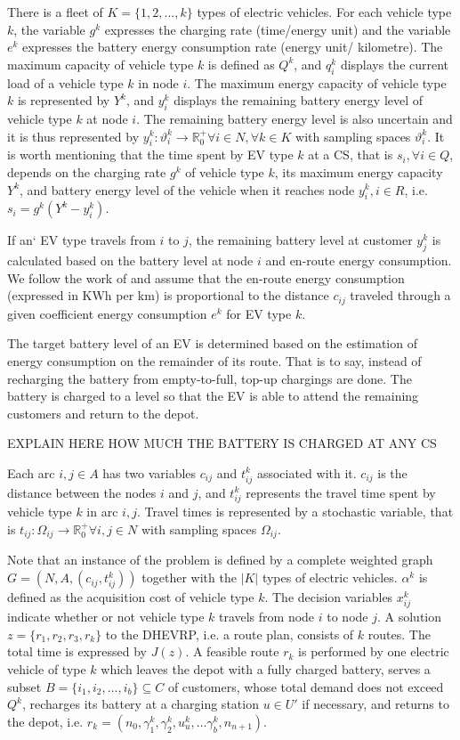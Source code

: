 \documentclass[11pt]{article}
\begin{document}
There is a fleet of $K = \{1,2,...,k\}$ types of electric vehicles. For each vehicle type $k$, the variable $g^k$ expresses the charging rate (time/energy unit) and the variable $e^k$ expresses the battery energy consumption rate (energy unit/ kilometre). The maximum capacity of vehicle type $k$ is defined as $Q^k$, and $q^k_i$ displays the current load of a vehicle type $k$ in node $i$. The maximum energy capacity of vehicle type $k$ is represented by $Y^k$, and $y^k_i$ displays the remaining battery energy level of vehicle type $k$ at node $i$. The remaining battery energy level is also uncertain and it is thus represented by $y^k_i:\vartheta^k_{i} \to \mathbb{R}_0^+ \forall i \in N, \forall k \in K$ with sampling spaces $\vartheta^k_{i}$. It is worth mentioning that the time spent by EV type $k$ at a CS, that is $s_i, \forall i \in Q$, depends on the charging rate $g^k$ of vehicle type $k$, its maximum energy capacity $Y^k$, and battery energy level of the vehicle when it reaches node $y^k_i, i \in R$, i.e. $s_i= g^k(Y^k - y^k_i)$.


If an` EV type travels from $i$ to $j$, the remaining battery level at customer $y^k_j$ is calculated based on the battery level at node $i$ and en-route energy consumption. We follow the work of \cite{Felipe2014} and assume that the en-route energy consumption (expressed in KWh per km) is proportional to the distance $c_{ij}$ traveled through a given coefficient energy consumption $e^k$ for EV type $k$.

The target battery level of an EV is determined based on the estimation of energy consumption on the remainder of its route. That is to say, instead of recharging the battery from empty-to-full, top-up chargings are done. The battery is charged to a level so that the EV is able to attend the remaining customers and return to the depot.

EXPLAIN HERE HOW MUCH THE BATTERY IS CHARGED AT ANY CS

Each arc $i,j \in A$ has two variables $c_{ij}$ and $t^k_{ij}$ associated with it. $c_{ij}$ is the distance between the nodes $i$ and $j$, and $t^k_{ij}$ represents the travel time spent by vehicle type $k$ in arc $i,j$.  Travel times is represented by a stochastic variable, that is $t_{ij}:\Omega_{ij} \to \mathbb{R}_0^+ \forall i,j \in N$ with sampling spaces $\Omega_{ij}$.

Note that an instance of the problem is defined by a complete weighted graph $G = (N, A, (c_{ij},t^k_{ij}))$ together with the $|K|$ types of electric vehicles. $\alpha^k$ is defined as the acquisition cost of vehicle type $k$. The decision variables $x^k_{ij}$ indicate whether or not vehicle type $k$ travels from node $i$ to node $j$. A solution $z = \{r_1, r_2, r_3, r_k\}$ to the DHEVRP, i.e. a route plan, consists of $k$ routes. The total time is expressed by $J(z)$. A feasible route $r_k$ is performed by one electric vehicle of type $k$ which leaves the depot with a fully charged battery, serves a subset $B = \{i_1, i_2, \dots, i_b\} \subseteq C$ of customers, whose total demand does not exceed $Q^k$, recharges its battery at a charging station $u \in U'$ if necessary, and returns to the depot, i.e. $r_k = (n_0, \gamma^k_1, \gamma^k_2, u^k_u, \dots \gamma^k_b, n_{n+1})$. 
\end{document}
